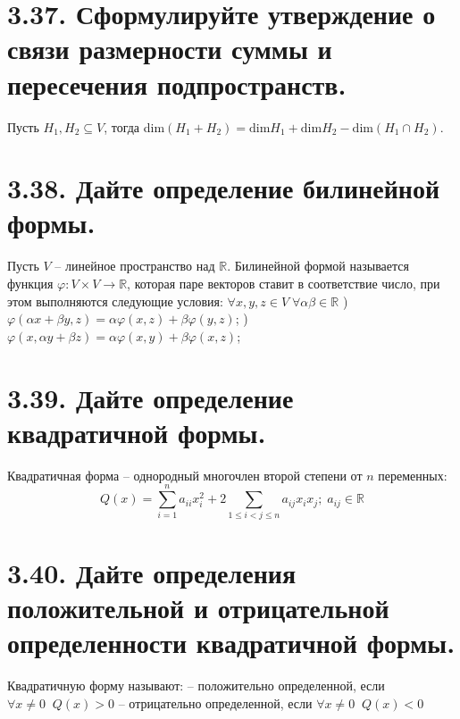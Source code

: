 \documentclass{article}
\begin{document}
\section*{\LARGE 3.37. Сформулируйте утверждение о связи размерности суммы и пересечения подпространств. }
Пусть $H_1, H_2 \subseteq V$, тогда dim$(H_1 + H_2) = \mbox{dim}H_1 + \mbox{dim}H_2 - \mbox{dim}(H_1 \cap H_2)$.

\section*{\LARGE 3.38. Дайте определение билинейной формы.}
Пусть $V$ -- линейное пространство над $\mathbb{R}$. Билинейной формой называется функция $\varphi : V \times V \rightarrow \mathbb{R}$, которая паре векторов ставит в соответствие число, при этом выполняются следующие условия:
\newline $\forall x,y,z \in V \; \forall \alpha \beta \in \mathbb{R}$
\newline{}) $\varphi(\alpha x + \beta y, z) = \alpha \varphi(x, z) + \beta \varphi (y, z)$;
\newline{}) $\varphi(x, \alpha y + \beta z) = \alpha \varphi(x, y) + \beta \varphi (x, z)$;

\section*{\LARGE 3.39. Дайте определение квадратичной формы.}
Квадратичная форма -- однородный многочлен второй степени от $n$ переменных:
$$Q(x) = \sum_{i = 1}^n a_{ii}x_i^2 + 2\sum_{1 \le i < j \le n} a_{ij}x_ix_j; \; a_{ij} \in \mathbb{R}$$

\section*{\LARGE 3.40. Дайте определения положительной и отрицательной определенности квадратичной формы.}
Квадратичную форму называют:
\newline\indent -- положительно определенной, если $\forall x \ne 0 \;\; Q(x) > 0$ 
\newline\indent -- отрицательно определенной, если $\forall x \ne 0 \;\; Q(x) < 0$ 
\end{document}
